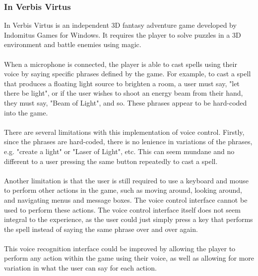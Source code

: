 \documentclass[11pt]{article}
\begin{document}
\subsubsection{In Verbis Virtus}
In Verbis Virtus \cite{RefWorks:22} is an independent 3D fantasy adventure game developed by Indomitus Games for Windows. It requires the player to solve puzzles in a 3D environment and battle enemies using magic.
\\
\\
When a microphone is connected, the player is able to cast spells using their voice by saying specific phrases defined by the game. For example, to cast a spell that produces a floating light source to brighten a room, a user must say, "let there be light", or if the user wishes to shoot an energy beam from their hand, they must say, "Beam of Light", and so. These phrases appear to be hard-coded into the game.
\\
\\
There are several limitations with this implementation of voice control. Firstly, since the phrases are hard-coded, there is no lenience in variations of the phrases, e.g. "create a light" or "Laser of Light", etc. This can seem mundane and no different to a user pressing the same button repeatedly to cast a spell.
\\
\\
Another limitation is that the user is still required to use a keyboard and mouse to perform other actions in the game, such as moving around, looking around, and navigating menus and message boxes. The voice control interface cannot be used to perform these actions. The voice control interface itself does not seem integral to the experience, as the user could just simply press a key that performs the spell instead of saying the same phrase over and over again.
\\
\\
This voice recognition interface could be improved by allowing the player to perform any action within the game using their voice, as well as allowing for more variation in what the user can say for each action.
\end{document}
